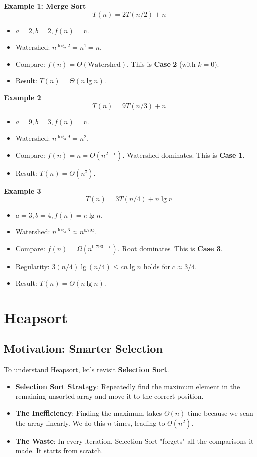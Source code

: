 \documentclass[12pt]{article}
\theoremstyle{blueplain}
\theoremstyle{bluedef}
\theoremstyle{blueremark}
\begin{document}
\textbf{Example 1: Merge Sort}
\[ T(n) = 2T(n/2) + n \]
\begin{itemize}
    \item $a=2, b=2, f(n)=n$.
    \item Watershed: $n^{\log_2 2} = n^1 = n$.
    \item Compare: $f(n) = \Theta(\text{Watershed})$. This is \textbf{Case 2} (with $k=0$).
    \item Result: $T(n) = \Theta(n \lg n)$.
\end{itemize}

\textbf{Example 2}
\[ T(n) = 9T(n/3) + n \]
\begin{itemize}
    \item $a=9, b=3, f(n)=n$.
    \item Watershed: $n^{\log_3 9} = n^2$.
    \item Compare: $f(n) = n = O(n^{2-\epsilon})$. Watershed dominates. This is \textbf{Case 1}.
    \item Result: $T(n) = \Theta(n^2)$.
\end{itemize}

\textbf{Example 3}
\[ T(n) = 3T(n/4) + n \lg n \]
\begin{itemize}
    \item $a=3, b=4, f(n)=n \lg n$.
    \item Watershed: $n^{\log_4 3} \approx n^{0.793}$.
    \item Compare: $f(n) = \Omega(n^{0.793+\epsilon})$. Root dominates. This is \textbf{Case 3}.
    \item Regularity: $3(n/4) \lg(n/4) \le c n \lg n$ holds for $c \approx 3/4$.
    \item Result: $T(n) = \Theta(n \lg n)$.
\end{itemize}

\clearpage


\section{Heapsort}

\subsection{Motivation: Smarter Selection}

To understand Heapsort, let's revisit \textbf{Selection Sort}.
\begin{itemize}
    \item \textbf{Selection Sort Strategy}: Repeatedly find the maximum element in the remaining unsorted array and move it to the correct position.
    \item \textbf{The Inefficiency}: Finding the maximum takes $\Theta(n)$ time because we scan the array linearly. We do this $n$ times, leading to $\Theta(n^2)$.
    \item \textbf{The Waste}: In every iteration, Selection Sort "forgets" all the comparisons it made. It starts from scratch.
\end{itemize}
\end{document}
